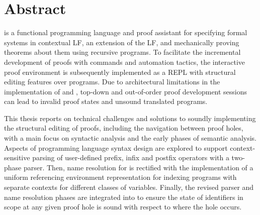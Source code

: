 \chapter*{Abstract}
\vspace{-2em}

\Beluga is a functional programming language and proof assistant for specifying formal systems in contextual \acs{LF}, an extension of the \acl{LF}, and mechanically proving theorems about them using recursive programs.
To facilitate the incremental development of proofs with commands and automation tactics, the \Harpoon interactive proof environment is subsequently implemented as a \acl{REPL} with structural editing features over \Beluga programs.
Due to architectural limitations in the implementation of \Beluga and \Harpoon, top-down and out-of-order proof development sessions can lead to invalid proof states and unsound translated programs.

This thesis reports on technical challenges and solutions to soundly implementing the structural editing of proofs, including the navigation between proof holes, with a main focus on syntactic analysis and the early phases of semantic analysis.
Aspects of programming language syntax design are explored to support context-sensitive parsing of user-defined prefix, infix and postfix operators with a two-phase parser.
Then, name resolution for \Beluga is rectified with the implementation of a uniform referencing environment representation for indexing programs with separate contexts for different classes of variables.
Finally, the revised parser and name resolution phases are integrated into \Harpoon to ensure the state of identifiers in scope at any given proof hole is sound with respect to where the hole occurs.
